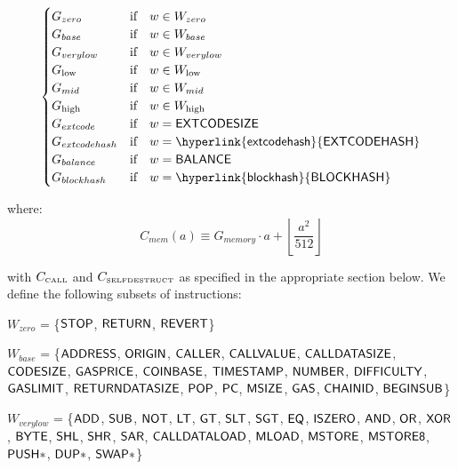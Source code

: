 \begin{equation}
\begin{cases}
G_{zero} & \text{if} \quad w \in W_{zero}\\
G_{base} & \text{if} \quad w \in W_{base}\\
G_{verylow} & \text{if} \quad w \in W_{verylow}\\
G_{\mathrm{low}} & \text{if} \quad w \in W_{\mathrm{low}}\\
G_{mid} & \text{if} \quad w \in W_{mid}\\
G_{\mathrm{high}} & \text{if} \quad w \in W_{\mathrm{high}}\\
G_{extcode} & \text{if} \quad w = \op{EXTCODESIZE}\\
G_{extcodehash} & \text{if} \quad w = \op{\hyperlink{extcodehash}{EXTCODEHASH}}\\
G_{balance} & \text{if} \quad w = \op{BALANCE}\\
G_{blockhash} & \text{if} \quad w = \op{\hyperlink{blockhash}{BLOCKHASH}}\\
\end{cases}
\end{equation}


where:
\begin{equation}
C_{mem}(a) \equiv G_{memory} \cdot a + \left\lfloor \dfrac{a^2}{512} \right\rfloor
\end{equation}

with $C_\text{\tiny CALL}$ and $C_\text{\tiny SELFDESTRUCT}$ as specified in the appropriate section below. We define the following subsets of instructions:

$W_{zero}$ = \{$\mathsf{STOP}$, $\mathsf{RETURN}$, $\mathsf{REVERT}$\}

$W_{base}$ = \{$\mathsf{ADDRESS}$, $\mathsf{ORIGIN}$, $\mathsf{CALLER}$, $\mathsf{CALLVALUE}$, $\mathsf{CALLDATASIZE}$, $\mathsf{CODESIZE}$, $\mathsf{GASPRICE}$, $\mathsf{COINBASE}$,
\newline \noindent\hspace*{1.75cm} $\mathsf{TIMESTAMP}$, $\mathsf{NUMBER}$, $\mathsf{DIFFICULTY}$, $\mathsf{GASLIMIT}$, $\mathsf{RETURNDATASIZE}$, $\mathsf{POP}$, $\mathsf{PC}$, $\mathsf{MSIZE}$, $\mathsf{GAS}$, 
\newline \noindent\hspace*{1.75cm} $\mathsf{CHAINID}$, $\mathsf{BEGINSUB}$\}

$W_{verylow}$ = \{$\mathsf{ADD}$, $\mathsf{SUB}$, $\mathsf{NOT}$, $\mathsf{LT}$, $\mathsf{GT}$, $\mathsf{SLT}$, $\mathsf{SGT}$, $\mathsf{EQ}$, $\mathsf{ISZERO}$, $\mathsf{AND}$, $\mathsf{OR}$, $\mathsf{XOR}$, $\mathsf{BYTE}$, $\mathsf{SHL}$, $\mathsf{SHR}$, $\mathsf{SAR}$, 
\newline \noindent\hspace*{1.75cm} $\mathsf{CALLDATALOAD}$, $\mathsf{MLOAD}$, $\mathsf{MSTORE}$, $\mathsf{MSTORE8}$, $\mathsf{PUSH*}$, $\mathsf{DUP*}$, $\mathsf{SWAP*}$\}

